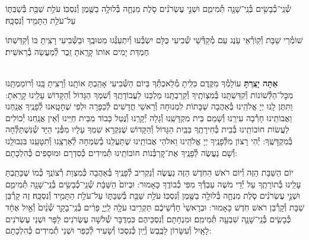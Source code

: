 \documentclass[twoside, openany, parskip=half, 11pt]{book}
\begin{document}
שְׁ֯נֵֽי־כְ֯בָשִׂ֥ים בְּ֯נֵֽי־שָׁנָ֖ה תְּ֯מִימִ֑ם וּשְׁנֵ֣י עֶשְׂרֹנִ֗ים סֹ֧לֶת מִנְחָ֛ה בְּ֯לוּלָ֥ה בַשֶּׁ֖מֶן וְ֯נִסְכּֽוֹ׃ עֹלַ֥ת שַׁבַּ֖ת בְּ֯שַׁבַּתּ֑וֹ עַל־עֹלַ֥ת הַתָּמִ֖יד וְ֯נִסְכָּֽהּ׃

שׁוֹמְ֯רֵי שַׁבָּת וְ֯קֽוֹרְ֯אֵי עֹֽנֶג עַם מְ֯קַדְּ֯שֵׁי שְׁ֯בִיעִי כֻּלָּם יִשְׂבְּ֯עוּ וְ֯יִתְעַנְּ֯גוּ מִטּוּבֶֽךָ וּבַשְּׁ֯בִיעִי רָצִֽיתָ בּוֹ וְ֯קִדַּשְׁתּוֹ חֶמְדַּת יָמִים אוֹתוֹ קָרָֽאתָ זֵֽכֶר לְ֯מַעֲשֵׂה בְ֯רֵאשִׁית׃

\shabboskiddushhayom {}

\begin{sometimes}

\label{shabbosroshchodesh}
\\
\textbf{אַתָּה יָצַֽרְתָּ}
עוֹלָמְ֯ךָ מִקֶּֽדֶם כִּלִּֽיתָ מְ֯לַאכְתְּ֯ךָ בַּיוֹם הַשְּׁ֯בִיעִי אָהַֽבְתָּ אוֹתָֽנוּ וְ֯רָצִֽיתָ בָּֽנוּ וְ֯רוֹמַמְתָּֽנוּ מִכׇּל־הַלְּ֯שׁוֹנוֹת וְ֯קִדַּשְׁתָּֽנוּ בְּ֯מִצְוֹתֶֽיךָ וְ֯קֵרַבְתָּֽנוּ מַלְכֵּנוּ לַעֲבוֹדָתֶֽךָ וְ֯שִׁמְךָ הַגָּדוֹל וְ֯הַקָּדוֹשׁ עָלֵֽינוּ קָרָֽאתָ: וַתִּתֶּן לָֽנוּ יְיָ אֱלֹהֵֽינוּ בְּ֯אַהֲבָה שַׁבָּתוֹת לִמְנוּחָה וְ֯רָאשֵׁי חֳדָשִׁים לְ֯כַפָּרָה וּלְפִי שֶׁחָטָֽאנוּ לְ֯פָנֶֽיךָ אֲנַֽחְנוּ וַאֲבוֹתֵֽינוּ חָרְ֯בָה עִירֵֽנוּ וְ֯שָׁמֵם בֵּית מִקְדָּשֵֽׁנוּ וְ֯גָלָה יְ֯קָרֵֽנוּ וְ֯נֻּטַּל כָּבוֹד מִבֵּית חַיֵּֽינוּ וְ֯אֵין אֲנַֽחְנוּ יְ֯כוֹלִים לַעֲשׂוֹת חוֹבוֹתֵֽינוּ בְּ֯בֵית בְּ֯חִירָתֶֽךָ בַּבַּֽיִת הַגָּדוֹל וְ֯הַקָּדוֹשׁ שֶׁנִּקְרָא שִׁמְךָ עָלָיו מִפְּ֯נֵי הַיָּד שְׁ֯נִּשְׁתַּלְּ֯חָה בְּ֯מִקְדָּשֶֽׁךָ: יְ֯הִי רָצוֹן מִלְּ֯פָנֶֽיךָ יְיָ אֱלֹהֵֽינוּ וֵאלֹהֵי אֲבוֹתֵֽינוּ שֶׁתַּעֲלֵֽנוּ בְ֯שִׂמְחָה לְ֯אַרְצֵֽנוּ וְ֯תִטָּעֵֽנוּ בִּגְבוּלֵֽנוּ וְ֯שָׁם נַעֲשֶׂה לְ֯פָנֶֽיךָ אֶת־קׇרְבְּ֯נוֹת חוֹבוֹתֵֽינוּ תְּ֯מִידִים כְּ֯סִדְרָם וּמוּסָפִים כְּ֯הִלְכָתָם:

יוֹם הַשַּׁבָּת הַזֶּה וְ֯יוֹם רֹאשׁ הַחֹֽדֶשׁ הַזֶּה נַעֲשֶׂה וְ֯נַקְרִיב לְ֯פָנֶֽיךָ בְּ֯אַהֲבָה כְּ֯מִצְוַת רְ֯צוֹנֶֽךָ כְּ֯מוֹ שֶׁכָּתַֽבְתָּ עָלֵֽינוּ בְּ֯תוֹרָתֶֽךָ עַל יְ֯דֵי מֹשֶׁה עַבְדְּ֯ךָ מִפִּי כְ֯בוֹדֶֽךָ כָּאָמוּר: וּבְיוֹם֙ הַשַּׁבָּ֔ת שְׁ֯נֵֽי־כְ֯בָשִׂ֥ים בְּ֯נֵֽי־שָׁנָ֖ה תְּ֯מִימִ֑ם וּשְׁנֵ֣י עֶשְׂרֹנִ֗ים סֹ֧לֶת מִנְחָ֛ה בְּ֯לוּלָ֥ה בַשֶּׁ֖מֶן וְ֯נִסְכּֽוֹ׃ עֹלַ֥ת שַׁבַּ֖ת בְּ֯שַׁבַּתּ֑וֹ עַל־עֹלַ֥ת הַתָּמִ֖יד וְ֯נִסְכָּֽהּ׃ זֶה קָרְ֯בַּן שַׁבָּת וְ֯קָרְ֯בַּן רֹאשׁ חֹֽדֶשׁ כָּאָמוּר: וּבְרָאשֵׁי֙ חָדְ֯שֵׁיכֶ֔ם תַּקְרִ֥יבוּ עֹלָ֖ה לַֽיְיָ֑ פָּרִ֨ים בְּ֯נֵֽי־בָקָ֤ר שְׁ֯נַ֨יִם֙ וְ֯אַ֣יִל אֶחָ֔ד כְּ֯בָשִׂ֧ים בְּ֯נֵֽי־שָׁנָ֛ה שִׁבְעָ֖ה תְּ֯מִימִֽם׃ וּמִנְחָתָם וְ֯נִסְכֵּיהֶם כִּמְדֻבָּר שְׁ֯לֹשָׁה עֶשְׂרֹנִים לַפָּר וּשְׁנֵי עֶשְׂרֹנִים לָאָֽיִל וְ֯עִשָּׂרוֹן לַכֶּֽבֶשׂ וְ֯יַֽיִן כְּ֯נִסְכּוֹ וְ֯שָׂעִיר לְ֯כַפֵּר וּשְׁנֵי תְ֯מִידִים כְּ֯הִלְכָתָם:


\end{sometimes}
\end{document}
